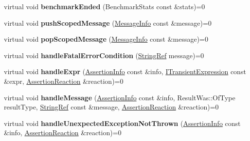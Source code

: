 \begin{DoxyCompactItemize}
virtual void {\bfseries benchmark\+Ended} (Benchmark\+Stats const \&stats)=0
\item 
\mbox{\label{struct_catch_1_1_i_result_capture_a91d154c1e087e383dcde5aad95cb6a05}} 
virtual void {\bfseries push\+Scoped\+Message} (\mbox{\hyperlink{struct_catch_1_1_message_info}{Message\+Info}} const \&message)=0
\item 
\mbox{\label{struct_catch_1_1_i_result_capture_a42bcb13276706bf8c3ce081ce16d37fd}} 
virtual void {\bfseries pop\+Scoped\+Message} (\mbox{\hyperlink{struct_catch_1_1_message_info}{Message\+Info}} const \&message)=0
\item 
\mbox{\label{struct_catch_1_1_i_result_capture_a48559e6598ba9474b903697b69c769b2}} 
virtual void {\bfseries handle\+Fatal\+Error\+Condition} (\mbox{\hyperlink{class_catch_1_1_string_ref}{String\+Ref}} message)=0
\item 
\mbox{\label{struct_catch_1_1_i_result_capture_a59a2b05391e464954575d2afb6d5d607}} 
virtual void {\bfseries handle\+Expr} (\mbox{\hyperlink{struct_catch_1_1_assertion_info}{Assertion\+Info}} const \&info, \mbox{\hyperlink{struct_catch_1_1_i_transient_expression}{I\+Transient\+Expression}} const \&expr, \mbox{\hyperlink{struct_catch_1_1_assertion_reaction}{Assertion\+Reaction}} \&reaction)=0
\item 
\mbox{\label{struct_catch_1_1_i_result_capture_a21788ebc64571abf322b80c8cc51794d}} 
virtual void {\bfseries handle\+Message} (\mbox{\hyperlink{struct_catch_1_1_assertion_info}{Assertion\+Info}} const \&info, Result\+Was\+::\+Of\+Type result\+Type, \mbox{\hyperlink{class_catch_1_1_string_ref}{String\+Ref}} const \&message, \mbox{\hyperlink{struct_catch_1_1_assertion_reaction}{Assertion\+Reaction}} \&reaction)=0
\item 
\mbox{\label{struct_catch_1_1_i_result_capture_a6382ed20486e2d9a020da971c6d5c53d}} 
virtual void {\bfseries handle\+Unexpected\+Exception\+Not\+Thrown} (\mbox{\hyperlink{struct_catch_1_1_assertion_info}{Assertion\+Info}} const \&info, \mbox{\hyperlink{struct_catch_1_1_assertion_reaction}{Assertion\+Reaction}} \&reaction)=0

\end{DoxyCompactItemize}
